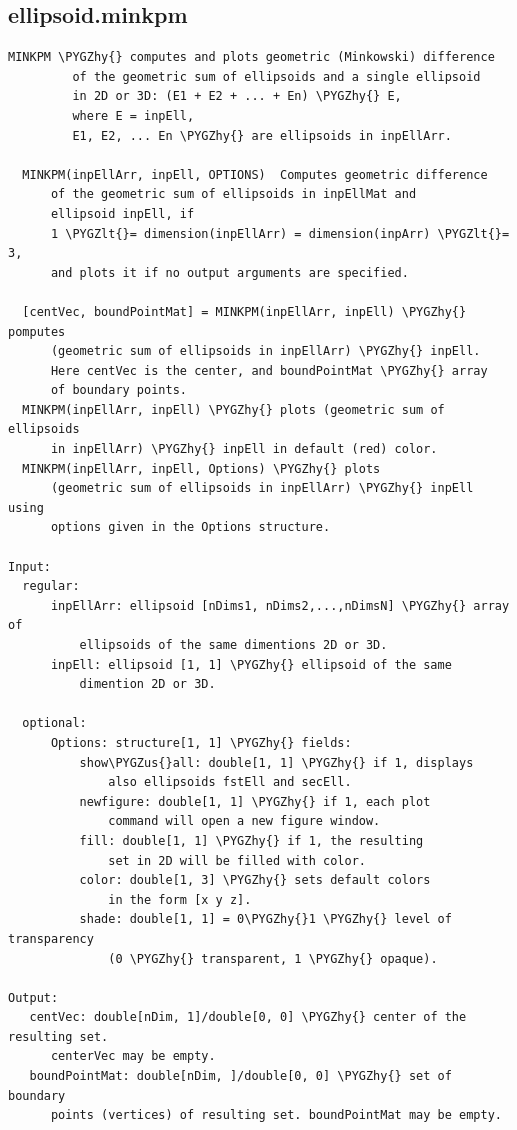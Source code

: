 \documentclass[letterpaper,10pt,english]{sphinxmanual}
\def\PYGZus{\char`\_}
\def\PYGZlt{\char`\<}
\def\PYGZhy{\char`\-}
\begin{document}
\subsection{ellipsoid.minkpm}
\label{chap_functions:ellipsoid-minkpm}
\begin{Verbatim}[commandchars=\\\{\}]
MINKPM \PYGZhy{} computes and plots geometric (Minkowski) difference
         of the geometric sum of ellipsoids and a single ellipsoid
         in 2D or 3D: (E1 + E2 + ... + En) \PYGZhy{} E,
         where E = inpEll,
         E1, E2, ... En \PYGZhy{} are ellipsoids in inpEllArr.

  MINKPM(inpEllArr, inpEll, OPTIONS)  Computes geometric difference
      of the geometric sum of ellipsoids in inpEllMat and
      ellipsoid inpEll, if
      1 \PYGZlt{}= dimension(inpEllArr) = dimension(inpArr) \PYGZlt{}= 3,
      and plots it if no output arguments are specified.

  [centVec, boundPointMat] = MINKPM(inpEllArr, inpEll) \PYGZhy{} pomputes
      (geometric sum of ellipsoids in inpEllArr) \PYGZhy{} inpEll.
      Here centVec is the center, and boundPointMat \PYGZhy{} array
      of boundary points.
  MINKPM(inpEllArr, inpEll) \PYGZhy{} plots (geometric sum of ellipsoids
      in inpEllArr) \PYGZhy{} inpEll in default (red) color.
  MINKPM(inpEllArr, inpEll, Options) \PYGZhy{} plots
      (geometric sum of ellipsoids in inpEllArr) \PYGZhy{} inpEll using
      options given in the Options structure.

Input:
  regular:
      inpEllArr: ellipsoid [nDims1, nDims2,...,nDimsN] \PYGZhy{} array of
          ellipsoids of the same dimentions 2D or 3D.
      inpEll: ellipsoid [1, 1] \PYGZhy{} ellipsoid of the same
          dimention 2D or 3D.

  optional:
      Options: structure[1, 1] \PYGZhy{} fields:
          show\PYGZus{}all: double[1, 1] \PYGZhy{} if 1, displays
              also ellipsoids fstEll and secEll.
          newfigure: double[1, 1] \PYGZhy{} if 1, each plot
              command will open a new figure window.
          fill: double[1, 1] \PYGZhy{} if 1, the resulting
              set in 2D will be filled with color.
          color: double[1, 3] \PYGZhy{} sets default colors
              in the form [x y z].
          shade: double[1, 1] = 0\PYGZhy{}1 \PYGZhy{} level of transparency
              (0 \PYGZhy{} transparent, 1 \PYGZhy{} opaque).

Output:
   centVec: double[nDim, 1]/double[0, 0] \PYGZhy{} center of the resulting set.
      centerVec may be empty.
   boundPointMat: double[nDim, ]/double[0, 0] \PYGZhy{} set of boundary
      points (vertices) of resulting set. boundPointMat may be empty.
\end{Verbatim}
\end{document}
